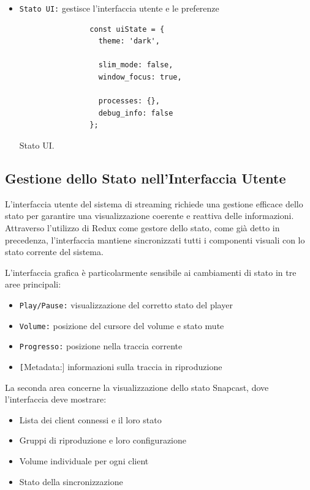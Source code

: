 \begin{itemize}
    \item \texttt{Stato UI:} gestisce l'interfaccia utente e le preferenze

          \begin{table}[H]
            \begin{minipage}{0.35\textwidth}
              \begin{verbatim}
                const uiState = {
                  theme: 'dark',
          
                  slim_mode: false,
                  window_focus: true,
          
                  processes: {},
                  debug_info: false
                };
              \end{verbatim}
            \end{minipage}
            \caption{Stato UI.}
            \label{tab:stato_ui}
          \end{table}
\end{itemize}

\subsection{Gestione dello Stato nell'Interfaccia Utente}

L'interfaccia utente del sistema di streaming richiede una gestione efficace dello stato per garantire una visualizzazione coerente e reattiva delle informazioni. Attraverso l'utilizzo di Redux come gestore dello stato, come già detto in precedenza, l'interfaccia mantiene sincronizzati tutti i componenti visuali con lo stato corrente del sistema.

L'interfaccia grafica è particolarmente sensibile ai cambiamenti di stato in tre aree principali:

\begin{itemize}
    \item \texttt{Play/Pause:} visualizzazione del corretto stato del player
    \item \texttt{Volume:} posizione del cursore del volume e stato mute
    \item \texttt{Progresso:} posizione nella traccia corrente
    \item \texttt[Metadata:] informazioni sulla traccia in riproduzione
\end{itemize}

La seconda area concerne la visualizzazione dello stato Snapcast, dove l'interfaccia deve mostrare:

\begin{itemize}
    \item Lista dei client connessi e il loro stato
    \item Gruppi di riproduzione e loro configurazione
    \item Volume individuale per ogni client
    \item Stato della sincronizzazione
\end{itemize}


